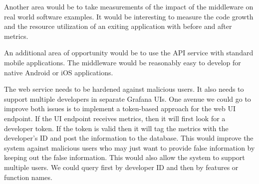 Another area would be to take measurements of the impact of the middleware on real world software examples. It would be interesting to measure the code growth and the resource utilization of an exiting application with before and after metrics. 

An additional area of opportunity would be to use the API service with standard mobile applications. The middleware would be reasonably easy to develop for native Android or iOS applications. 

The web service needs to be hardened against malicious users. It also needs to support multiple developers in separate Grafana UIs. One avenue we could go to improve both issues is to implement a token-based approach for the web UI endpoint. If the UI endpoint receives metrics, then it will first look for a developer token. If the token is valid then it will tag the metrics with the developer’s ID and post the information to the database. This would improve the system against malicious users who may just want to provide false information by keeping out the false information. This would also allow the system to support multiple users. We could query first by developer ID and then by features or function names. 